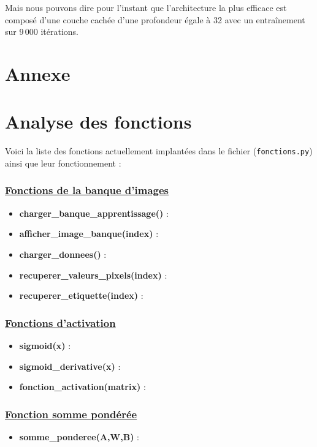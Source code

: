 \documentclass[12pt,a4paper]{article}
\begin{document}
Mais nous pouvons dire pour l'instant que l'architecture la plus efficace est composé d'une couche cachée d'une profondeur égale à 32 avec un entraînement sur 9\,000 itérations.

\newpage
\section{\huge{Annexe}}
\label{sec:annexe}
 
\section*{Analyse des fonctions}
\hypertarget{analyseFonctions}{}
Voici la liste des fonctions actuellement implantées dans le fichier (\texttt{fonctions.py}) ainsi que leur fonctionnement :

\subsubsection{\underline{Fonctions de la banque d'images}}
\begin{itemize}
    \item \textbf{charger\_banque\_apprentissage()} :
    \item \textbf{afficher\_image\_banque(index)} :
    \item \textbf{charger\_donnees()} :
    \item \textbf{recuperer\_valeurs\_pixels(index)} :
    \item \textbf{recuperer\_etiquette(index)} :
\end{itemize}

\subsubsection{\underline{Fonctions d'activation}}
\begin{itemize}
    \item \textbf{sigmoid(x)} :
    \item \textbf{sigmoid\_derivative(x)} :
    \item \textbf{fonction\_activation(matrix)} :
\end{itemize}

\subsubsection{\underline{Fonction somme pondérée}}

\begin{itemize}
    \item \textbf{somme\_ponderee(A,W,B)} :
\end{itemize}
\end{document}
